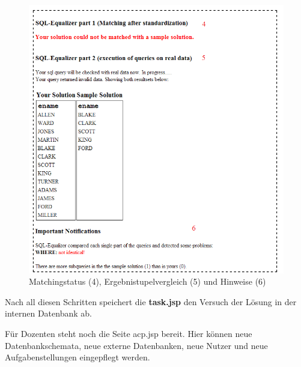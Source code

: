 \begin{figure}[H]
\centering
\includegraphics[scale=0.6]{Bilder/screen_prog2}
\caption{Matchingstatus (4), Ergebnistupelvergleich (5) und Hinweise (6)}
\label{fig:screen_prog2}
\end{figure}

Nach all diesen Schritten speichert die \textbf{task.jsp} den Versuch der Lösung in der internen Datenbank ab.

Für Dozenten steht noch die Seite acp.jsp bereit. Hier können neue Datenbankschemata, neue externe Datenbanken, neue Nutzer und neue Aufgabenstellungen eingepflegt werden.
